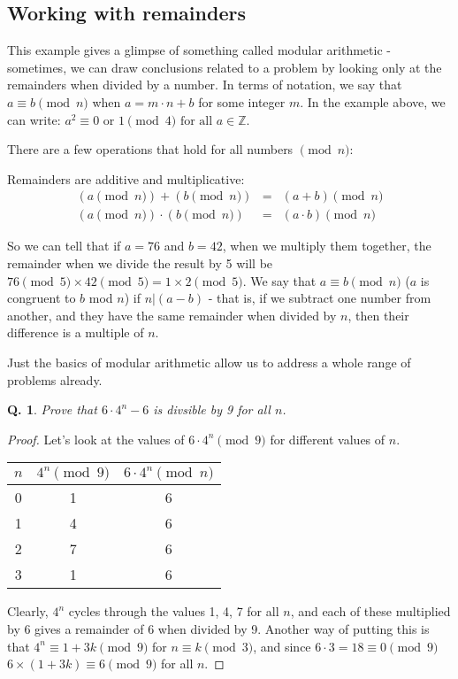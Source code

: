 \documentclass{article}
\newtheorem{question}{Q.}
\begin{document}
\subsection{Working with remainders}

This example gives a glimpse of something called modular arithmetic - sometimes,
we can draw conclusions related to a problem by looking only at the remainders
when divided by a number. In terms of notation, we say that $a \equiv b \pmod{n}$
when $a = m\cdot n+b$ for some integer $m$. In the example above, we can write:
$a^2 \equiv 0 \text{ or } 1 \pmod{4} \text{ for all } a\in \mathbb{Z}$.

There are a few operations that hold for all numbers $\pmod{n}$:

Remainders are additive and multiplicative:
\begin{eqnarray*}
	(a\pmod{n}) + (b\pmod{n}) & = & (a+b)\pmod{n} \\
	(a\pmod{n}) \cdot (b\pmod{n}) & = & (a\cdot b) \pmod{n}
\end{eqnarray*}

So we can tell that if $a=76$ and $b=42$, when we multiply them together, the
remainder when we divide the result by 5 will be $76 \pmod{5} \times 42 \pmod{5}
= 1\times 2 \pmod{5}$. We say that $a \equiv b \pmod{n}$ ($a$ is congruent to $b$
mod $n$) if $n|(a-b)$ - that is, if we subtract one number from another, and they
have the same remainder when divided by $n$, then their difference is a multiple
of $n$.  

Just the basics of modular arithmetic allow us to address a whole range of problems already.

\begin{question}Prove that $6\cdot 4^n - 6$ is divsible by 9 for all $n$.\end{question}
\begin{proof}
	Let's look at the values of $6 \cdot 4^n \pmod{9}$ for different
values of $n$. 

\begin{table}[htb]
\begin{tabular}{|c|c|c|}
\hline
	$n$ & $4^n \pmod{9}$ & $6\cdot 4^n \pmod{n}$\\   
\hline 
	0 & 1 & 6 \\
	1 & 4 & 6 \\
	2 & 7 & 6 \\
	3 & 1 & 6 \\
\hline 
\end{tabular}
\end{table}

Clearly, $4^n$ cycles through the values 1, 4, 7 for all $n$, and each of these multiplied
by $6$ gives a remainder of 6 when divided by 9. Another way of putting this is that
$4^n \equiv 1 +3k \pmod{9}$ for $n\equiv k \pmod{3}$, and since $6\cdot 3 = 18 \equiv 0 \pmod{9}$
$6\times (1+3k) \equiv 6 \pmod{9}$ for all $n$.
\end{proof}
\end{document}
